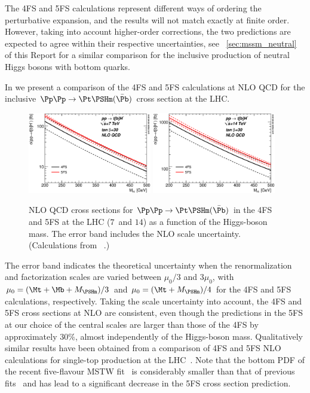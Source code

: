 The 4FS and 5FS calculations represent different ways of ordering the
perturbative expansion, and the results will not match exactly at
finite order. However, taking into account higher-order corrections,
the two predictions are expected to agree within their respective
uncertainties, see \Section~\ref{sec:mssm_neutral} of this Report for a similar comparison
for the inclusive production of neutral Higgs bosons with bottom
quarks.

In  we present a comparison of the 4FS and
5FS calculations at NLO QCD for the inclusive 
$\Pp \Pp \to \Pt  \PSHm(\bar{\Pb})$ cross section at the LHC.
%
\begin{figure}
\begin{center}
\includegraphics[width=0.48\textwidth]{YRHXS_MSSM_charged/YRHXS_MSSM_charged_fig6a.eps}
\includegraphics[width=0.48\textwidth]{YRHXS_MSSM_charged/YRHXS_MSSM_charged_fig6b.eps}
\caption{NLO QCD cross sections for 
    $\Pp\Pp \to {\Pt}\PSHm(\bar{\Pb})$ in the 4FS and 5FS at the LHC 
($7$\UTeV\ and $14$\UTeV) as a
  function of the Higgs-boson mass. The error band includes the NLO
  scale uncertainty. (Calculations from \Refs~\cite{Dittmaier:2009np,
    Weydert:2009vr}.)}
\label{fig:4fs_5fs}
\end{center}
\end{figure}
%        
The error band indicates the theoretical uncertainty when the
renormalization and factorization scales are varied between $\mu_0/3$
and $3\mu_0$,  with  $\mu_0 = (\Mt + \Mb + M_{\PSHm})/3$ 
and $\mu_0=(\Mt+M_{\PSHm})/4$ for the 4FS and 5FS 
calculations, respectively. 
Taking the scale uncertainty into account, the 4FS and
5FS cross sections at NLO are consistent, even though the predictions
in the 5FS at our choice of the central scales are larger than those of
the 4FS by approximately $30\%$, almost independently of the Higgs-boson
mass. Qualitatively similar results have been obtained from a
comparison of 4FS and 5FS NLO calculations for single-top production
at the LHC~\cite{Campbell:2009ss}. Note that the bottom PDF of the
recent five-flavour MSTW fit~\cite{Martin:2009iq} is considerably
smaller than that of previous fits~\cite{Martin:2004ir} and has lead
to a significant decrease in the 5FS cross section prediction.

